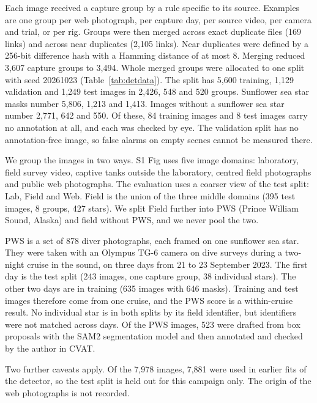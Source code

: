 Each image received a capture group by a rule specific to its source.
Examples are one group per web photograph, per capture day, per source video, per camera and trial, or per rig.
Groups were then merged across exact duplicate files (169 links) and across near duplicates (2,105 links).
Near duplicates were defined by a 256-bit difference hash with a Hamming distance of at most 8.
Merging reduced 3,607 capture groups to 3,494.
Whole merged groups were allocated to one split with seed 20261023 (Table~\ref{tab:detdata}).
The split has 5,600 training, 1,129 validation and 1,249 test images in 2,426, 548 and 520 groups.
Sunflower sea star masks number 5,806, 1,213 and 1,413.
Images without a sunflower sea star number 2,771, 642 and 550.
Of these, 84 training images and 8 test images carry no annotation at all, and each was checked by eye.
The validation split has no annotation-free image, so false alarms on empty scenes cannot be measured there.

We group the images in two ways.
S1 Fig uses five image domains: laboratory, field survey video, captive tanks outside the laboratory, centred field photographs and public web photographs.
The evaluation uses a coarser view of the test split: Lab, Field and Web.
Field is the union of the three middle domains (395 test images, 8 groups, 427 stars).
We split Field further into PWS (Prince William Sound, Alaska) and field without PWS, and we never pool the two.

PWS is a set of 878 diver photographs, each framed on one sunflower sea star.
They were taken with an Olympus TG-6 camera on dive surveys during a two-night cruise in the sound, on three days from 21 to 23 September 2023.
The first day is the test split (243 images, one capture group, 38 individual stars).
The other two days are in training (635 images with 646 masks).
Training and test images therefore come from one cruise, and the PWS score is a within-cruise result.
No individual star is in both splits by its field identifier, but identifiers were not matched across days.
Of the PWS images, 523 were drafted from box proposals with the SAM2 segmentation model and then annotated and checked by the author in CVAT.

Two further caveats apply.
Of the 7,978 images, 7,881 were used in earlier fits of the detector, so the test split is held out for this campaign only.
The origin of the web photographs is not recorded. 

